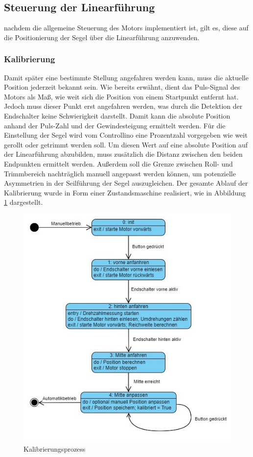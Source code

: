 \subsection{Steuerung der Linearführung}
nachdem die allgemeine Steuerung des Motors implementiert ist, gilt es, diese auf die Positionierung der Segel über die Linearführung anzuwenden. 
\subsubsection{Kalibrierung}
Damit später eine bestimmte Stellung angefahren werden kann, muss die aktuelle Position jederzeit bekannt sein. Wie bereits erwähnt, dient das Puls-Signal des Motors als Maß, wie weit sich die Position von einem Startpunkt entfernt hat. Jedoch muss dieser Punkt erst angefahren werden, was durch die Detektion der Endschalter keine Schwierigkeit darstellt. Damit kann die absolute Position anhand der Puls-Zahl und der Gewindesteigung ermittelt werden. Für die Einstellung der Segel wird vom Controllino eine Prozentzahl vorgegeben wie weit gerollt oder getrimmt werden soll. Um diesen Wert auf eine absolute Position auf der Linearführung abzubilden, muss zusätzlich die Distanz zwischen den beiden Endpunkten ermittelt werden. Außerdem soll die Grenze zwischen Roll- und Trimmbereich nachträglich manuell angepasst werden können, um potenzielle Asymmetrien in der Seilführung der Segel auszugleichen. Der gesamte Ablauf der Kalibrierung wurde in Form einer Zustandsmaschine realisiert, wie in Abbildung \ref{fig:calibration} dargestellt.
\begin{figure}[H]
	\centering
	\includegraphics[width=0.8\linewidth]{images/Software/Kalibrierungsprozess.jpg}
	\caption{Kalibrierungsprozess}
	\label{fig:calibration}
\end{figure}
